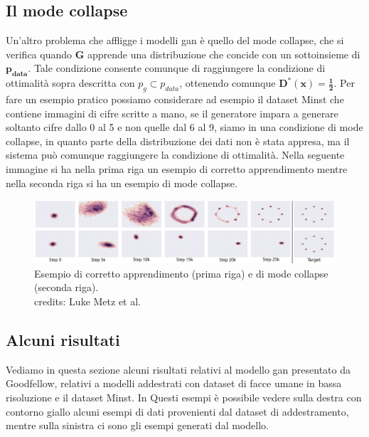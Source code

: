 \subsection{Il mode collapse}
Un'altro problema che affligge i modelli gan è quello del mode collapse, che si verifica quando $\mathbf{G}$ apprende una distribuzione 
che concide con un sottoinsieme di $\mathbf{p_{data}}$. Tale condizione consente comunque di raggiungere
la condizione di ottimalità sopra descritta con $p_{g} \subset p_{data}$, ottenendo comunque $\mathbf{D^*(x) = \frac{1}{2}}$.
Per fare un esempio pratico possiamo considerare ad esempio il dataset Minst che contiene immagini di cifre scritte a mano,
se il generatore impara a generare soltanto cifre dallo 0 al 5 e non quelle dal 6 al 9, siamo in una condizione di mode collapse, 
in quanto parte della distribuzione dei dati non è stata appresa, ma il sistema può comunque raggiungere la condizione di ottimalità.
Nella seguente immagine si ha nella prima riga un esempio di corretto apprendimento mentre nella seconda riga si ha un esempio di mode collapse.
\begin{figure}[H]
    \centering
    \includegraphics[width=1.0\textwidth]{imgs/mode_collapse.png}
    \caption{Esempio di corretto apprendimento (prima riga) e di mode collapse (seconda riga).\\
    credits: Luke Metz et al. \cite{metz2017unrolled}}
    \label{fig:mode_collapse}
\end{figure}

\subsection{Alcuni risultati}
Vediamo in questa sezione alcuni risultati relativi al modello gan presentato da Goodfellow, relativi a modelli addestrati con
dataset di facce umane in bassa risoluzione e il dataset Minst. In Questi esempi è possibile vedere sulla destra con contorno giallo
alcuni esempi di dati provenienti dal dataset di addestramento, mentre sulla sinistra ci sono gli esempi generati dal modello.

